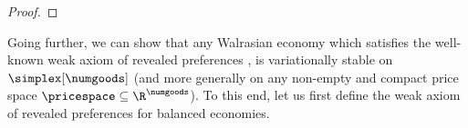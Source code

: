 \begin{proof}


\end{proof}
\fi 

Going further, we can show that any Walrasian economy which satisfies the well-known weak axiom of revealed preferences \citet{afriat1967construction, arrow-hurwicz}, is variationally stable on $\simplex[\numgoods]$ (and more generally on any non-empty and compact price space $\pricespace \subseteq \R^\numgoods$). To this end, let us first define the weak axiom of revealed preferences for balanced economies. 

